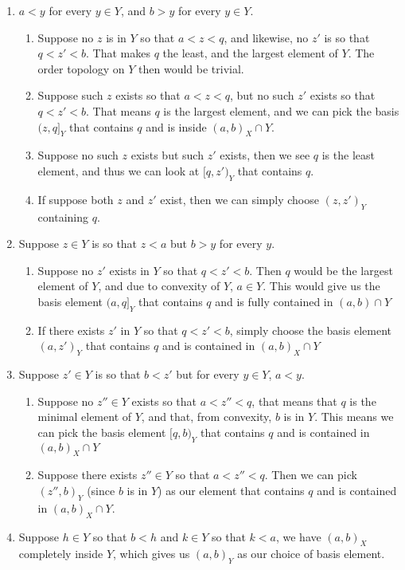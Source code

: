 \documentclass[main.tex]{subfiles}
\begin{document}
{\begin{enumerate}
\item $a< y$ for every $y \in Y$, and $b>y$ for every $y \in Y$. \begin{enumerate}\item Suppose no $z$ is in $Y$ so that $a<z<q$, and likewise, no $z'$ is so that $q<z'<b$. That makes $q$ the least, and the largest element of $Y$. The order topology on $Y$ then would be trivial. \item Suppose such $z$ exists so that $a<z<q$, but no such $z'$ exists so that $q<z'<b$. That means $q$ is the largest element, and we can pick the basis $(z,q]_Y$ that contains $q$ and is inside $(a,b)_X \cap Y$. \item Suppose no such $z$ exists but such $z' $ exists, then we see $q$ is the least element, and thus we can look at $[q,z')_Y$ that contains $q$. \item If suppose both $z$ and $z'$ exist, then we can simply choose $(z,z')_Y$ containing $q$.  \end{enumerate}
\item Suppose $z \in Y$ is so that $z<a$ but $b>y$ for every $y$. \begin{enumerate}
    \item Suppose no $z'$ exists in $Y$ so that $q<z'<b$. Then $q$ would be the largest element of $Y$, and due to convexity of $Y$, $a \in Y$. This would give us the basis element $(a,q]_Y$ that contains $q$ and is fully contained in $(a,b)\cap Y$
    \item If there exists $z'$ in $Y$ so that $q<z'<b$, simply choose the basis element $(a,z')_Y$ that contains $q$ and is contained in $(a,b)_X \cap Y$
\end{enumerate}
\item Suppose $z' \in Y$ is so that $b<z'$ but for every $y \in Y$, $a<y$. \begin{enumerate}
    \item Suppose no $z''\in Y$ exists so that $a<z''<q$, that means that $q$ is the minimal element of $Y$, and that, from convexity, $b$ is in $Y$. This means we can pick the basis element $[q,b)_Y$ that contains $q$ and is contained in $(a,b)_X\cap Y$
    \item Suppose there exists $z'' \in Y$ so that $a<z''<q$. Then we can pick $(z'',b)_Y$ (since $b$ is in $Y$) as our element that contains $q$ and is contained in $(a,b)_X \cap Y$.
\end{enumerate}
\item Suppose $h\in Y$ so that $b<h$ and $k \in Y$ so that $k<a$, we have $(a,b)_X$ completely inside $Y$, which gives us $(a,b)_Y$ as our choice of basis element.

\end{enumerate}}
\end{document}

